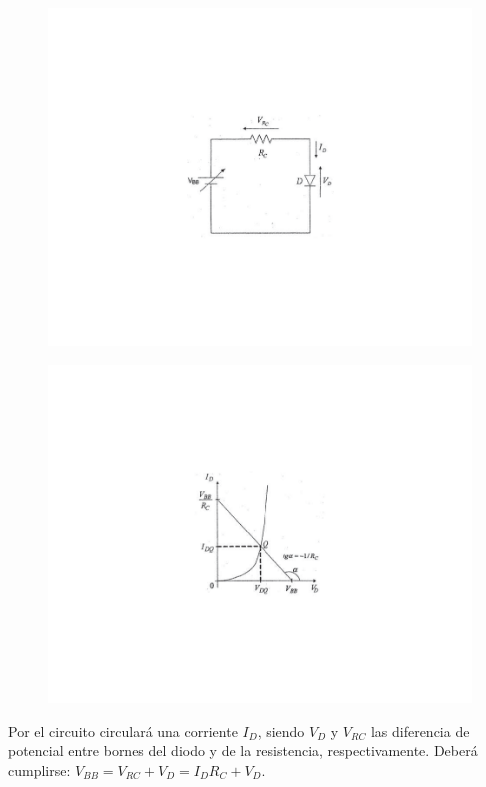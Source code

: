 \documentclass{book} %
\theoremstyle{definition}
\begin{document}
\begin{appendices}
\begin{figure}[!htbp]
\centering
\begin{minipage}{.5\textwidth}
  \centering
  \includegraphics[scale=1]{figurac05.pdf}
  \label{fig:c.5}
\end{minipage}%
\begin{minipage}{.5\textwidth}
  \centering
  \includegraphics[scale=1]{figurac06.pdf}
  \label{fig:c.6}
\end{minipage}
\end{figure}

Por el circuito circulará una corriente $I_D$, siendo $V_D$ y $V_{RC}$ las diferencia de potencial entre bornes del diodo y de la resistencia, respectivamente. Deberá cumplirse: $V_{BB}=V_{RC}+V_D=I_DR_C+V_D$.


\end{appendices}
\end{document}
